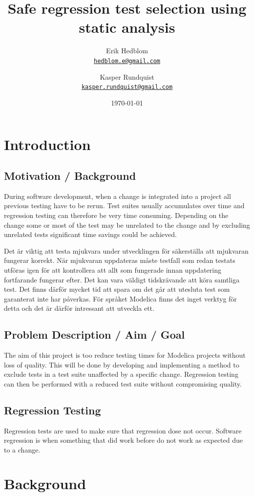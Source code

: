 \documentclass{cslthse-msc}
\author{
	Erik Hedblom \\
	{\normalsize \href{mailto:hedblom.e@gmail.com}{\texttt{hedblom.e@gmail.com}}}
	\and
	Kasper Rundquist \\
	{\normalsize \href{mailto:kasper.rundquist@gmail.com}{\texttt{kasper.rundquist@gmail.com}}}
}
\title{Safe regression test selection using static analysis}
\date{\today}
\begin{document}
\makefrontmatter
\chapter[Introduction]{Introduction}

\section{Motivation / Background}
During software development, when a change is integrated into a project all previous testing have to be rerun. Test suites usually accumulates over time and regression testing can therefore be very time consuming. Depending on the change some or most of the test may be unrelated to the change and by excluding unrelated tests significant time savings could be achieved. ~\cite{DUMMY}


Det är viktig att testa mjukvara under utvecklingen för säkerställa att mjukvaran fungerar korrekt. När mjukvaran uppdateras måste testfall som redan testats utföras igen för att kontrollera att allt som fungerade innan uppdatering fortfarande fungerar efter. Det kan vara väldigt tidskrävande att köra samtliga test. Det finns därför mycket tid att spara om det går att utesluta test som garanterat inte har påverkas. För språket Modelica finns det inget verktyg för detta och det är därför intressant att utveckla ett.

\section{Problem Description / Aim / Goal}

The aim of this project is too reduce testing times for Modelica projects without loss of quality. This will be done by developing and implementing a method to exclude tests in a test suite unaffected by a specific change. Regression testing can then be performed with a reduced test suite without compromising quality.

\section{Regression Testing}
Regression tests are used to make sure that regression dose not occur. Software regression is when something that did work before do not work as expected due to a change.

\chapter[Background]{Background}
\end{document}
